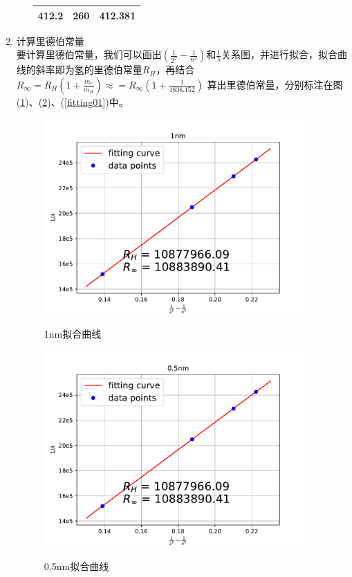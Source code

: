 \documentclass[a4paper]{article}
\begin{document}
\begin{enumerate}
\begin{enumerate}
\begin{table}[!h]
\begin{tabular}{|c|c|c|}
412.2           & 260   & 412.381  \\ \hline
\end{tabular}
\end{table}
\end{enumerate}
\item 计算里德伯常量\\
要计算里德伯常量，我们可以画出$(\frac{1}{2^2} - \frac{1}{n^2})$和$\frac{1}{\lambda}$关系图，并进行拟合，拟合曲线的斜率即为氢的里德伯常量$R_H$，再结合
$R_{\infty} = R_H(1+\frac{m_e}{m_H}) \approx = R_{\infty}(1+\frac{1}{1836.152})$
算出里德伯常量，分别标注在图(\ref{fitting1})、(\ref{fitting05})、(\ref{fitting01})中。
\begin{figure}[!th]
\centering
\includegraphics[width=10cm]{fig/fitting1nm.pdf}\\
\caption{1nm拟合曲线}\label{fitting1}
\end{figure}
\begin{figure}[!h]
\centering
\includegraphics[width=10cm]{fig/fitting05nm.pdf}\\
\caption{0.5nm拟合曲线}\label{fitting05}
\end{figure}

\end{enumerate}
\end{document}
